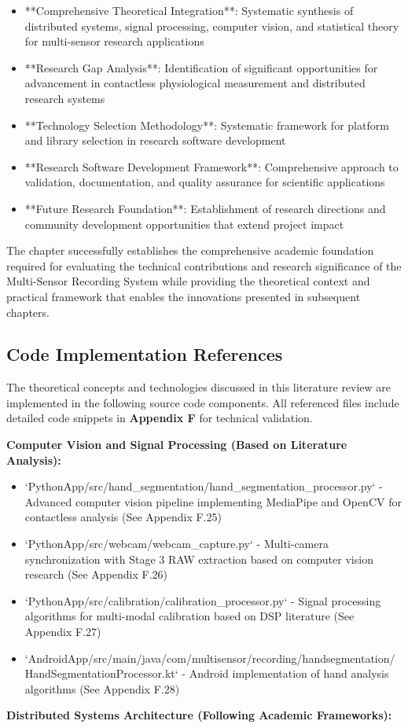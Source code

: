 \documentclass[12pt,a4paper]{article}
\begin{document}
\begin{itemize}
\item **Comprehensive Theoretical Integration**: Systematic synthesis of distributed systems, signal processing, computer
  vision, and statistical theory for multi-sensor research applications
\item **Research Gap Analysis**: Identification of significant opportunities for advancement in contactless physiological
  measurement and distributed research systems
\item **Technology Selection Methodology**: Systematic framework for platform and library selection in research software
  development
\item **Research Software Development Framework**: Comprehensive approach to validation, documentation, and quality
  assurance for scientific applications
\item **Future Research Foundation**: Establishment of research directions and community development opportunities that
  extend project impact

\end{itemize}
The chapter successfully establishes the comprehensive academic foundation required for evaluating the technical
contributions and research significance of the Multi-Sensor Recording System while providing the theoretical context and
practical framework that enables the innovations presented in subsequent chapters.

\subsection{Code Implementation References}

The theoretical concepts and technologies discussed in this literature review are implemented in the following source
code components. All referenced files include detailed code snippets in \textbf{Appendix F} for technical validation.

\textbf{Computer Vision and Signal Processing (Based on Literature Analysis):}

\begin{itemize}
\item `PythonApp/src/hand_segmentation/hand_segmentation_processor.py` - Advanced computer vision pipeline implementing
  MediaPipe and OpenCV for contactless analysis (See Appendix F.25)
\item `PythonApp/src/webcam/webcam_capture.py` - Multi-camera synchronization with Stage 3 RAW extraction based on computer
  vision research (See Appendix F.26)
\item `PythonApp/src/calibration/calibration_processor.py` - Signal processing algorithms for multi-modal calibration based
  on DSP literature (See Appendix F.27)
\item `AndroidApp/src/main/java/com/multisensor/recording/handsegmentation/HandSegmentationProcessor.kt` - Android
  implementation of hand analysis algorithms (See Appendix F.28)

\end{itemize}
\textbf{Distributed Systems Architecture (Following Academic Frameworks):}
\end{document}
